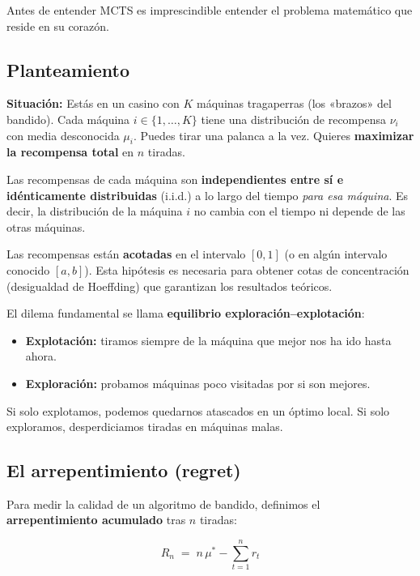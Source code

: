 \documentclass[12pt, a4paper]{article}
\newcounter{hipnum}
\newcommand{\hip}[1]{%
  \stepcounter{hipnum}%
  \begin{tcolorbox}[hipotesis, title={Hipótesis H\thehipnum}]
    #1
  \end{tcolorbox}%
}
\begin{document}
Antes de entender MCTS es imprescindible entender el problema matemático que
reside en su corazón.

\subsection{Planteamiento}

\textbf{Situación:} Estás en un casino con $K$ máquinas tragaperras (los
«brazos» del bandido). Cada máquina $i \in \{1,\ldots,K\}$ tiene una
distribución de recompensa $\nu_i$ con media desconocida $\mu_i$. Puedes tirar
una palanca a la vez. Quieres \textbf{maximizar la recompensa total} en $n$
tiradas.

\hip{Las recompensas de cada máquina son \textbf{independientes entre sí e
idénticamente distribuidas} (i.i.d.) a lo largo del tiempo \emph{para esa
máquina}. Es decir, la distribución de la máquina $i$ no cambia con el tiempo
ni depende de las otras máquinas.}

\hip{Las recompensas están \textbf{acotadas} en el intervalo $[0,1]$ (o en
algún intervalo conocido $[a,b]$). Esta hipótesis es necesaria para obtener
cotas de concentración (desigualdad de Hoeffding) que garantizan los resultados
teóricos.}

El dilema fundamental se llama \textbf{equilibrio exploración--explotación}:

\begin{itemize}
  \item \textbf{Explotación:} tiramos siempre de la máquina que mejor nos ha
    ido hasta ahora.
  \item \textbf{Exploración:} probamos máquinas poco visitadas por si son
    mejores.
\end{itemize}

Si solo explotamos, podemos quedarnos atascados en un óptimo local. Si solo
exploramos, desperdiciamos tiradas en máquinas malas.

\subsection{El arrepentimiento (regret)}

Para medir la calidad de un algoritmo de bandido, definimos el
\textbf{arrepentimiento acumulado} tras $n$ tiradas:

\begin{equation}
  R_n \;=\; n\,\mu^* - \sum_{t=1}^{n} r_t
\end{equation}
\end{document}
